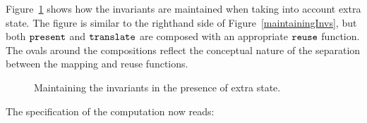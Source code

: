 Figure~\ref{maintainExtraState} shows how the invariants are maintained when taking into account extra state. The figure is similar to the righthand side of Figure~\ref{maintainingInvs}, but both ${\tt present}$ and
 ${\tt translate}$ are composed with an appropriate ${\tt reuse}$ function. The ovals around the compositions reflect the conceptual nature of the separation between the mapping and reuse functions. 

\begin{figure}
\begin{center}
\begin{center}
\end{center}
\caption{Maintaining the invariants in the presence of extra state.}\label{maintainExtraState} 
\end{center}
\end{figure}



The specification of the computation now reads: 

